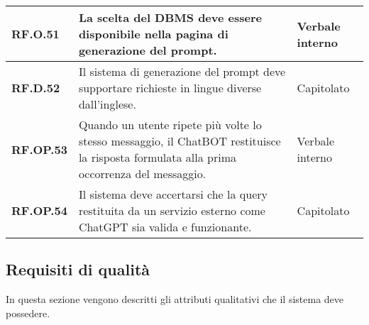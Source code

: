 \begin{adjustwidth}{-0.5cm}{-0.5cm}
\begin{longtable}{|P{3cm}|P{6,5cm}|>{\arraybackslash}P{4cm}|}
    \hline
    \textbf{RF.O.51} & La scelta del DBMS deve essere disponibile nella pagina di generazione del prompt. & Verbale interno \\
    \hline
    \textbf{RF.D.52} & Il sistema di generazione del prompt deve supportare richieste in lingue diverse dall'inglese. & Capitolato \\
    \hline
    \textbf{RF.OP.53} & Quando un utente ripete più volte lo stesso messaggio, il ChatBOT restituisce la risposta formulata alla prima occorrenza del messaggio. & Verbale interno \\
    \hline
    \textbf{RF.OP.54} & Il sistema deve accertarsi che la query  restituita da un servizio esterno come ChatGPT sia valida e funzionante. & Capitolato \\
  \end{longtable}
\end{adjustwidth}
\egroup

\subsection{Requisiti di qualità}
\par In questa sezione vengono descritti gli attributi qualitativi che il sistema deve possedere.

